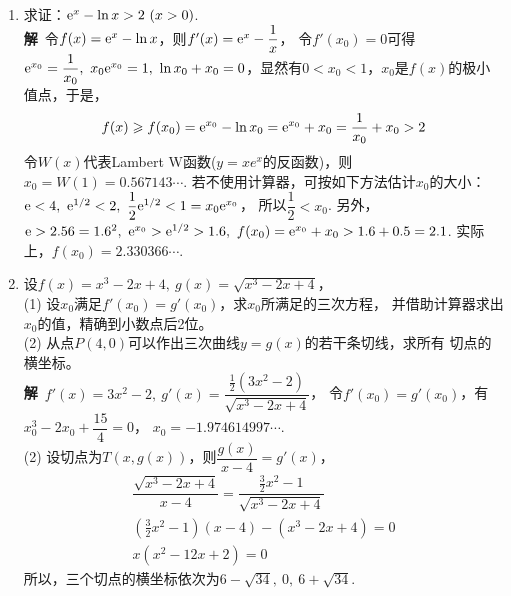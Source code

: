 \begin{enumerate}[label={【\textbf{例\thechapter.\arabic*}】},
 leftmargin=\inteval{\myenumleftmargin}pt,
 itemsep=\inteval{\myenumitempsep}pt,
 itemindent=\inteval{\myenumitemindent}pt]
\item 求证：$ \e^x-\ln x>2\ (x>0) $. \\
\textbf{解}\ 令$ f(x)=\mathrm{e}^x-\ln x $，则$ f'(x)=\mathrm{e}^x-\dfrac{1}{x} $，
令$ f'(x_0)=0 $可得$ \e^{x_0}=\dfrac{1}{x_0},\ x_0\e^{x_0}=1,\ 
\ln x_0+x_0=0 $，显然有$ 0<x_0<1 $，$ x_0 $是$ f(x) $的极小值点，于是，
\begin{align*}
    f(x)\geqslant f(x_0)=\mathrm{e}^{x_0}-\ln x_0=\mathrm{e}^{x_0}+x_0=\dfrac{1}{x_0}+x_0>2
\end{align*}
令$ W(x) $代表Lambert W函数($ y=xe^x $的反函数)，则$ x_0=W(1)=0.567143\cdots $.
若不使用计算器，可按如下方法估计$ x_0 $的大小：
$ \e<4 ,\ \e^{1/2}< 2,\ \dfrac{1}{2}\e^{1/2} <1=x_0\e^{x_0} $，
所以$ \dfrac{1}{2}<x_0 $. 另外，
$ \e>2.56=1.6^2,\ \e^{x_0}>\e^{1/2}>1.6,\ f(x_0)=\e^{x_0}+x_0
>1.6+0.5=2.1 $. 实际上，$ f(x_0)=2.330366\cdots $. 

\item  设$ f(x)=x^3-2x+4,\ g(x)=\sqrt{x^3-2x+4} $，\\
(1) 设$ x_0 $满足$ f'(x_0)=g'(x_0) $，求$ x_0 $所满足的三次方程，
并借助计算器求出$x_0$的值，精确到小数点后2位。\\
(2) 从点$ P(4,0) $可以作出三次曲线$ y=g(x) $的若干条切线，求所有
切点的横坐标。\\
\textbf{解}\ $ f'(x)=3x^2-2,\ g'(x)=
\dfrac{\frac{1}{2}(3x^2-2)}{\sqrt{x^3-2x+4}} $，
令$ f'(x_0)=g'(x_0) $，有$ x_0^3-2x_0+\dfrac{15}{4}=0 $，
$x_0=-1.974614997\cdots $. \\
(2) 设切点为$ T(x,g(x)) $，则$ \dfrac{g(x)}{x-4}=g'(x) $，
\begin{gather*}
    \dfrac{\sqrt{x^3-2x+4}}{x-4}=
    \dfrac{\frac{3}{2}x^2-1}{\sqrt{x^3-2x+4}} \\
    \left(\frac{3}{2}x^2-1\right)(x-4)-(x^3-2x+4)=0 \\
    x(x^2-12x + 2)=0
\end{gather*}
所以，三个切点的横坐标依次为$ 6-\sqrt{34},\ 0,\ 6+\sqrt{34}$.


\end{enumerate}
